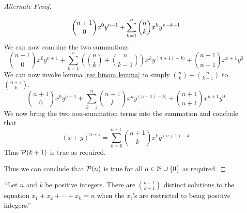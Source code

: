 \begin{proof}[Alternate Proof]
\begin{itemize}
\[                        \dbinom{n + 1}{0} x^0y^{n + 1} + \displaystyle\sum_{k = 1}^{n} \dbinom{n}{k}x^k y^{n - k + 1}
                    \]
                    We can now combine the two summations
                    \[
                        \binom{n + 1}{0} x^0y^{n + 1} +
                        \sum_{k = 1}^{n} \left(\binom{n}{k} + \binom{n}{k - 1}\right) x^{k} y^{(n + 1) - k)} +
                        \binom{n + 1}{n + 1} x^{n + 1}y^0
                    \]
                    We can now invoke lemma \ref{rec binom lemma} to simply $\binom{n}{k} + \binom{n}{k - 1}$
                    to $\binom{n + 1}{k}$.
                    \[
                        \binom{n + 1}{0} x^0y^{n + 1} +
                        \sum_{k = 1}^{n} \binom{n + 1}{k}x^{k} y^{(n + 1) - k)} +
                        \binom{n + 1}{n + 1} x^{n + 1}y^0
                    \]
                    We now bring the two non-summation terms into the summation and conclude
                    that
                    \[
                        (x + y)^{n + 1} = \sum_{k = 0}^{n + 1} \binom{n + 1}{k} x^k y^{(n + 1) - k}
                    \]
                    Thus $\mathcal{P}(k + 1)$ is true as required.
            \end{itemize}
            Thus we can conclude that $\mathcal{P}(n)$ is true for all $n \in \mathbb{N} \cup \left\{0\right\}$
            as required. \QED
        \end{proof}
        \begin{theorem}
            $``$Let $n$ and $k$ be positive integers. There are $\binom{n - 1}{k - 1}$ distinct
            solutions to the equation $x_1 + x_2 + \cdots + x_k = n$ when the $x_i$'s are restricted
            to being positive integers.''
            \label{Pirates and Gold 1}
        \end{theorem}
